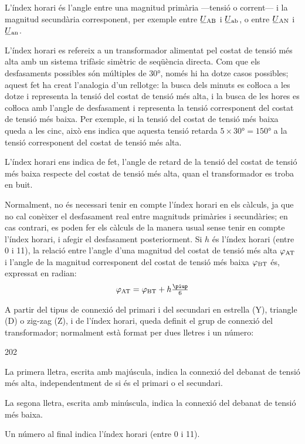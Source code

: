L'índex horari és l'angle entre una magnitud  primària ---tensió o corrent--- i la magnitud secundària corresponent, per exemple entre $\cmplx{U}\ped{AB}$ i $\cmplx{U}\ped{ab}$, o entre $\cmplx{U}\ped{AN}$ i $\cmplx{U}\ped{an}$.

L'índex horari es refereix a un transformador alimentat pel costat de tensió més alta  amb un sistema trifàsic simètric de seqüència directa. Com que els desfasaments possibles són múltiples de \ang{30}, només hi ha dotze casos possibles; aquest fet ha creat l'analogia d'un rellotge: la busca dels minuts es coŀloca a les dotze i representa la tensió del costat de tensió més alta, i la busca de les hores es coŀloca amb l'angle de desfasament i representa la tensió corresponent del costat de tensió més baixa. Per exemple, si la tensió del costat de tensió més baixa queda a les cinc, això ens indica que aquesta tensió retarda $5\times \ang{30}= \ang{150}$ a la tensió corresponent del costat de tensió més alta.

L'índex horari ens indica de fet, l'angle de retard de la tensió del costat de tensió més baixa respecte del costat de tensió més alta, quan el transformador es troba en buit.

Normalment, no és necessari tenir en compte l'índex horari en els càlculs, ja que no cal conèixer el desfasament real entre magnituds primàries i secundàries; en cas contrari, es poden fer els càlculs de la manera usual sense tenir en compte l'índex horari, i afegir el desfasament posteriorment. Si $h$ és l'índex horari (entre 0 i 11), la relació entre l'angle d'una magnitud del costat de tensió més alta $\varphi_\mathrm{AT}$ i l'angle de la magnitud corresponent del costat de tensió més baixa $\varphi_\mathrm{BT}$ és, expressat en radian:
\begin{equation}
    \varphi\ped{AT} = \varphi\ped{BT} + h\tfrac{\piup}{6}\label{eq:fi-AT-BT}
\end{equation}


A partir del tipus de connexió del primari i del secundari en estrella (Y), triangle (D) o zig-zag (Z), i de l'índex horari, queda definit el grup de connexió del transformador; normalment està format per dues lletres i un número:
\begin{dingautolist}{202}
   \item La primera lletra, escrita amb majúscula, indica la connexió del debanat de tensió més alta, independentment de si és el primari o el secundari.
   \item La segona lletra, escrita amb minúscula, indica la connexió del debanat de tensió més baixa.
   \item Un número al final indica l'índex horari (entre 0 i 11).
\end{dingautolist}

